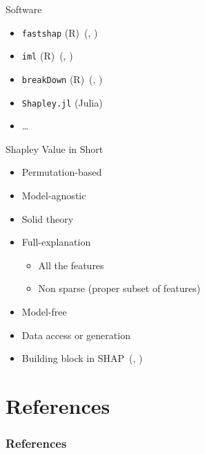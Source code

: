 \documentclass[dvipsnames]{beamer}
\renewcommand{\cite}[1]{(\citeauthor{#1}, \citeyear{#1})}
\begin{document}




\begin{frame}[fragile]{Software}
	\begin{itemize}
		\item \verb|fastshap| (R)~\cite{jethani2021fastshap}
		\item \verb|iml| (R)~\cite{molnar2018iml}
		\item \verb|breakDown| (R)~\cite{staniak2018explanations}
		\item \verb|Shapley.jl| (Julia)~\footnotemark
		\item \dots
	\end{itemize}
\end{frame}

\begin{frame}{Shapley Value in Short}
	\begin{itemize}
		\item Permutation-based
		\item Model-agnostic
		\item Solid theory
		\item Full-explanation
		\begin{itemize}
			\item All the features
			\item Non sparse (proper subset of features)
		\end{itemize}
		\item Model-free
		\item Data access or generation
		\item Building block in SHAP~\cite{lundberg2017unified}
	\end{itemize}
\end{frame}

\section{References}
\begin{frame}[allowframebreaks]
\frametitle{References}
\printbibliography
\end{frame}
\end{document}
